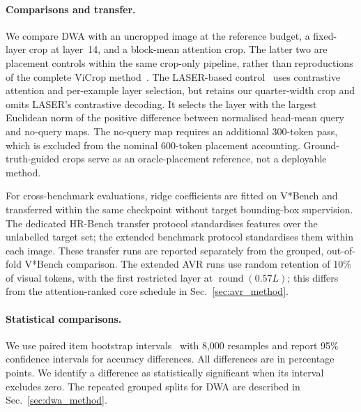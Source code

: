 \documentclass{article} %
\begin{document}
\paragraph{Comparisons and transfer.}
We compare DWA with an uncropped image at the reference budget, a
fixed-layer crop at layer~14, and a block-mean attention crop. The latter
two are placement controls within the same crop-only pipeline, rather
than reproductions of the complete ViCrop method~\citep{vicrop}.
The LASER-based control~\citep{laser} uses contrastive attention and
per-example layer selection, but retains our quarter-width crop and
omits LASER's contrastive decoding. It selects the layer with the largest
Euclidean norm of the positive difference between normalised head-mean
query and no-query maps. The no-query map requires an additional
300-token pass, which is excluded from the nominal 600-token placement
accounting. Ground-truth-guided crops serve as
an oracle-placement reference, not a deployable method.

For cross-benchmark evaluations, ridge coefficients are fitted on
V*Bench and transferred within the same checkpoint without target
bounding-box supervision. The dedicated HR-Bench transfer protocol standardises features over
the unlabelled target set; the extended benchmark protocol standardises
them within each image. These transfer runs are reported separately from
the grouped, out-of-fold V*Bench comparison. The extended AVR runs use
random retention of 10\% of visual tokens, with the first restricted
layer at $\operatorname{round}(0.57L)$; this differs from the
attention-ranked core schedule in Sec.~\ref{sec:avr_method}.

\paragraph{Statistical comparisons.}
We use paired item bootstrap intervals~\citep{efron1979bootstrap}
with 8,000 resamples and report 95\% confidence intervals for accuracy
differences. All differences are in percentage points. We identify a
difference as statistically significant when its interval excludes zero. The repeated grouped splits for DWA are described in
Sec.~\ref{sec:dwa_method}.
\end{document}

